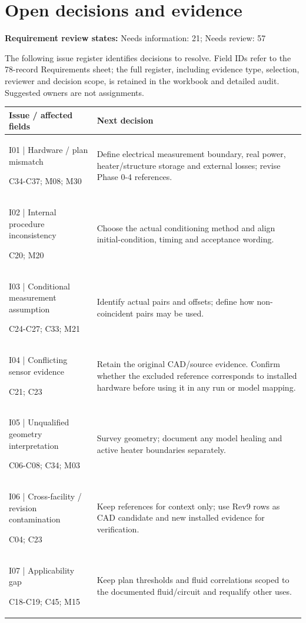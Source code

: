 \documentclass[11pt]{article}
\begin{document}
\clearpage\section{Open decisions and evidence}\label{issues-detail}
\label{requirements}
\textbf{Requirement review states:} Needs information: 21; Needs review: 57\par
The following issue register identifies decisions to resolve. Field IDs refer to the 78-record Requirements sheet; the full register, including evidence type, selection, reviewer and decision scope, is retained in the workbook and detailed audit. Suggested owners are not assignments.
\begingroup\small\setlength{\tabcolsep}{4pt}
\begin{longtable}{>{\raggedright\arraybackslash}p{}>{\raggedright\arraybackslash}p{}}
\toprule
\textbf{Issue / affected fields} & \textbf{Next decision}\\\midrule\endhead
I01 | Hardware / plan mismatch\par C34-C37; M08; M30 & Define electrical measurement boundary, real power, heater/structure storage and external losses; revise Phase 0-4 references.\\[4pt]
I02 | Internal procedure inconsistency\par C20; M20 & Choose the actual conditioning method and align initial-condition, timing and acceptance wording.\\[4pt]
I03 | Conditional measurement assumption\par C24-C27; C33; M21 & Identify actual pairs and offsets; define how non-coincident pairs may be used.\\[4pt]
I04 | Conflicting sensor evidence\par C21; C23 & Retain the original CAD/source evidence. Confirm whether the excluded reference corresponds to installed hardware before using it in any run or model mapping.\\[4pt]
I05 | Unqualified geometry interpretation\par C06-C08; C34; M03 & Survey geometry; document any model healing and active heater boundaries separately.\\[4pt]
I06 | Cross-facility / revision contamination\par C04; C23 & Keep references for context only; use Rev9 rows as CAD candidate and new installed evidence for verification.\\[4pt]
I07 | Applicability gap\par C18-C19; C45; M15 & Keep plan thresholds and fluid correlations scoped to the documented fluid/circuit and requalify other uses.\\[4pt]

\end{longtable}
\end{document}
